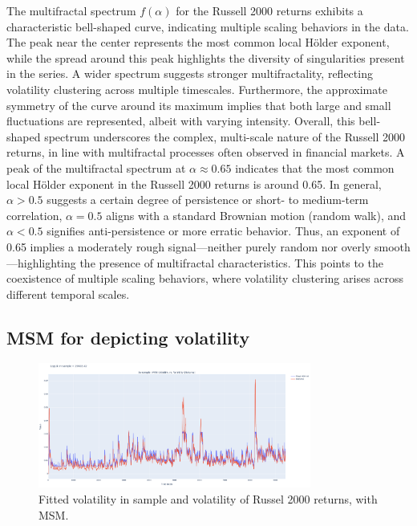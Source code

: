 \documentclass[11pt]{extarticle}
\begin{document}
\FloatBarrier

The multifractal spectrum $f(\alpha)$ for the Russell 2000 returns exhibits a characteristic bell-shaped curve,
indicating multiple scaling behaviors in the data. The peak near the center represents the most common local Hölder
exponent, while the spread around this peak highlights the diversity of singularities present in the series. A wider
spectrum suggests stronger multifractality, reflecting volatility clustering across multiple timescales. Furthermore,
the approximate symmetry of the curve around its maximum implies that both large and small fluctuations are represented,
albeit with varying intensity. Overall, this bell-shaped spectrum underscores the complex, multi-scale nature of the
Russell 2000 returns, in line with multifractal processes often observed in financial markets.
A peak of the multifractal spectrum at $\alpha \approx 0.65$ indicates that the most common local Hölder exponent
in the Russell 2000 returns is around 0.65. In general, $\alpha > 0.5$ suggests a certain degree of persistence or
short- to medium-term correlation, $\alpha = 0.5$ aligns with a standard Brownian motion (random walk),
and $\alpha < 0.5$ signifies anti-persistence or more erratic behavior. Thus, an exponent of 0.65 implies a
moderately rough signal—neither purely random nor overly smooth—highlighting the presence of multifractal characteristics.
This points to the coexistence of multiple scaling behaviors, where volatility clustering arises across different temporal scales.

\subsection{MSM for depicting volatility}

\begin{figure}[!ht]
    \centering
    \includegraphics[width=0.8\textwidth]{img/msm_vol}
    \caption{Fitted volatility in sample and volatility of Russel 2000 returns, with MSM.}
    \label{fig:msm_fitted_vol}
\end{figure}
\end{document}
